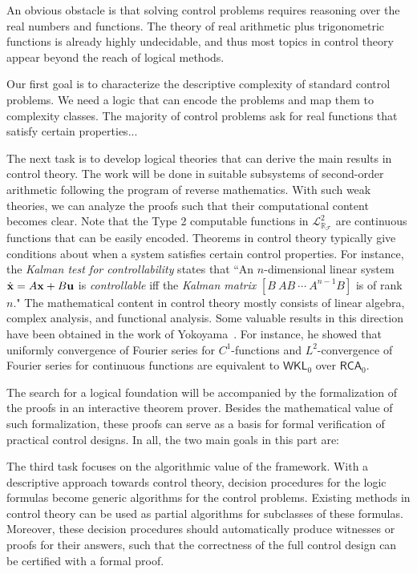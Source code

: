 \documentclass[10pt]{article}
\newcommand{\lrf}{\mathcal{L}_{\mathbb{R}_{\mathcal{F}}}}
\theoremstyle{definition}
\begin{document}
An obvious obstacle is that solving control problems requires reasoning over the real numbers and functions. The theory of real arithmetic plus trigonometric functions is already highly undecidable, and thus most topics in control theory appear beyond the reach of logical methods. 

Our first goal is to characterize the descriptive complexity of standard control problems. We need a logic that can encode the problems and map them to complexity classes. The majority of control problems ask for real functions that satisfy certain properties...

The next task is to develop logical theories that can derive the main results in control theory.
The work will be done in suitable subsystems of second-order arithmetic following the program of reverse mathematics. With such weak theories, we can analyze the proofs such that their computational content becomes clear. Note that the Type 2 computable functions in  $\lrf^2$ are continuous functions that can be easily encoded. Theorems in control theory typically give conditions about when a system satisfies certain control properties. For instance, the {\em Kalman test for controllability} states that ``An $n$-dimensional linear system $\dot {\bf x} = A{\bf x}+B{\bf u}$ is {\em controllable} iff the {\em Kalman matrix}
$[B\ AB\ \cdots\ A^{n-1}B]$ is of rank $n$." The mathematical content in control theory mostly consists of linear algebra, complex analysis, and functional analysis. Some valuable results in this direction have been obtained in the work of Yokoyama~\cite{yoko}. For instance, he showed that uniformly convergence of Fourier series for $C^1$-functions and $L^2$-convergence of Fourier series for continuous functions are equivalent to $\mathsf{WKL}_0$ over $\mathsf{RCA}_0$. 

The search for a logical foundation will be accompanied by the formalization of the proofs in an interactive theorem prover. Besides the mathematical value of such formalization, these proofs can serve as a basis for formal verification of practical control designs. In all, the two main goals in this part are:

The third task focuses on the algorithmic value of the framework. With a descriptive approach towards control theory, decision procedures for the logic formulas become generic algorithms for the control problems. Existing methods in control theory can be used as partial algorithms for subclasses of these formulas. Moreover, these decision procedures should automatically produce witnesses or proofs for their answers, such that the correctness of the full control design can be certified with a formal proof.
\end{document}
